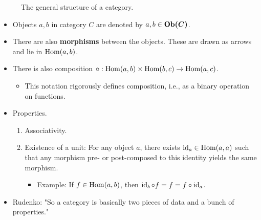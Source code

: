 \documentclass[../notes.tex]{subfiles}
\begin{document}
\begin{itemize}
\begin{figure}[h!]
        \caption{The general structure of a category.}
        \label{fig:category}
    \end{figure}
    \begin{itemize}
        \item Objects $a,b$ in category $C$ are denoted by $a,b\in\bm{\Ob(C)}$.
        \item There are also \textbf{morphisms} between the objects. These are drawn as arrows and lie in $\operatorname{Hom}(a,b)$.
        \item There is also composition $\circ:\operatorname{Hom}(a,b)\times\operatorname{Hom}(b,c)\to\operatorname{Hom}(a,c)$.
        \begin{itemize}
            \item This notation rigorously defines composition, i.e., as a binary operation on functions.
        \end{itemize}
        \item Properties.
        \begin{enumerate}
            \item Associativity.
            \item Existence of a unit: For any object $a$, there exists $\operatorname{id}_a\in\operatorname{Hom}(a,a)$ such that any morphism pre- or post-composed to this identity yields the same morphism.
            \begin{itemize}
                \item Example: If $f\in\operatorname{Hom}(a,b)$, then $\operatorname{id}_b\circ f=f=f\circ\operatorname{id}_a$.
            \end{itemize}
        \end{enumerate}
        \item Rudenko: "So a category is basically two pieces of data and a bunch of properties."

\end{itemize}
\end{itemize}
\end{document}
